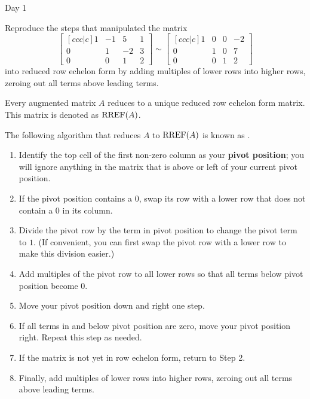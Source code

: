 \begin{applicationActivities}{Day 1}
\begin{activity}
  Reproduce the steps that manipulated the matrix
  \[
    \begin{bmatrix}[ccc|c]
      1 & -1 &  5 & 1 \\
      0 &  1 & -2 & 3 \\
      0 &  0 &  1 & 2
    \end{bmatrix}\sim
    \begin{bmatrix}[ccc|c]
      1 &  0 &  0 & -2 \\
      0 &  1 &  0 & 7 \\
      0 &  0 &  1 & 2
    \end{bmatrix}
  \]
  into reduced row echelon form by adding multiples of lower rows into
  higher rows, zeroing out all terms above leading terms.
\end{activity}

\begin{fact}
  Every augmented matrix \(A\) reduces to a unique reduced row echelon form
  matrix. This matrix is denoted as \(\operatorname{RREF}(A)\).
\end{fact}

\begin{definition}
  The following algorithm that reduces \(A\) to \(\operatorname{RREF}(A)\) is known as
  .

  \begin{multicols}{2}\noindent
  \begin{enumerate}
    \item Identify
    the top cell of the first non-zero column as your \textbf{pivot position};
    you will ignore anything in the matrix that is above or left of your
    current pivot position.
    \item If the pivot position contains a \(0\), swap its row with a lower
          row that does not contain a \(0\) in its column.
    \item Divide the pivot row by the term in pivot position to change the
          pivot term to \(1\). (If convenient, you can first swap the
          pivot row with a lower row to make this division easier.)
    \item Add multiples of the pivot row to all lower rows so that all terms
          below pivot position become \(0\).
    \item Move your pivot position down and right one step.
    \item If all terms in and below pivot position are zero, move your
          pivot position right. Repeat this step as needed.
    \item If the matrix is not yet in row echelon form, return to Step 2.
    \item Finally, add multiples of lower rows into higher rows, zeroing out
          all terms above leading terms.
  \end{enumerate}
  \end{multicols}
\end{definition}


\end{applicationActivities}

